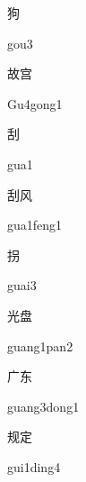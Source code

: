\begin{multicols*}{2}
\begin{verbete}[gou3]{狗}
\begin{pronuncia}{gou3}
\end{pronuncia}
\end{verbete}

\begin{verbete}[Gu4gong1]{故宫}
\begin{pronuncia}{Gu4gong1}
\end{pronuncia}
\end{verbete}

\begin{verbete}[gua1]{刮}
\begin{pronuncia}{gua1}
\end{pronuncia}
\end{verbete}

\begin{verbete}{刮风}
\begin{pronuncia}{gua1feng1}
\end{pronuncia}
\end{verbete}

\begin{verbete}[guai3]{拐}
\begin{pronuncia}{guai3}
\end{pronuncia}
\end{verbete}

\begin{verbete}{光盘}
\begin{pronuncia}{guang1pan2}
\end{pronuncia}
\end{verbete}

\begin{verbete}{广东}
\begin{pronuncia}{guang3dong1}
\end{pronuncia}
\end{verbete}

\begin{verbete}{规定}
\begin{pronuncia}{gui1ding4}
\end{pronuncia}
\end{verbete}


\end{multicols*}
